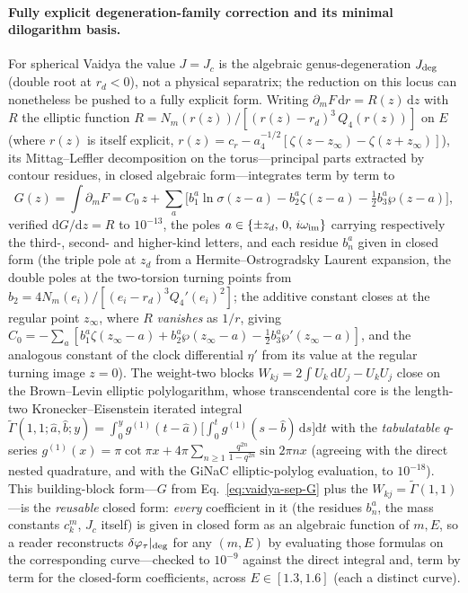 \documentclass[12pt]{iopart}
\newcommand{\Jc}{J_{c}}
\newcommand{\dd}{\mathrm{d}}
\begin{document}
\paragraph{Fully explicit degeneration-family correction and its minimal dilogarithm
basis.} For spherical Vaidya the value $J=\Jc$ is the algebraic genus-degeneration
$J_{\rm deg}$ (double root at $r_d<0$), not a physical separatrix; the reduction on this
locus can nonetheless be pushed to a fully explicit form. Writing
$\partial_m F\,\dd r=R(z)\,\dd z$ with $R$ the elliptic function
$R=N_m(r(z))/[(r(z)-r_d)^3\,Q_4(r(z))]$ on $E$ (where $r(z)$ is itself explicit,
$r(z)=c_r-a_4^{-1/2}[\zeta(z-z_\infty)-\zeta(z+z_\infty)]$), its Mittag--Leffler
decomposition on the torus---principal parts extracted by contour residues, in
closed algebraic form---integrates term by term to
\begin{equation}
    G(z)=\int\partial_m F=C_0\,z+\sum_a\Big[b_1^a\ln\sigma(z-a)-b_2^a\zeta(z-a)
        -\tfrac12 b_3^a\wp(z-a)\Big],
    \label{eq:vaidya-sep-G}
\end{equation}
verified $\dd G/\dd z=R$ to $10^{-13}$, the poles $a\in\{\pm z_d,\,0,\,i\omega_{\rm im}\}$
carrying respectively the third-, second- and higher-kind letters, and each residue
$b_n^a$ given in closed form (the triple pole at $z_d$ from a Hermite--Ostrogradsky
Laurent expansion, the double poles at the two-torsion turning points from
$b_2=4N_m(e_i)/[(e_i-r_d)^3 Q_4'(e_i)^2]$; the additive constant closes at the
regular point $z_\infty$, where $R$ \emph{vanishes} as $1/r$, giving
$C_0=-\sum_a[b_1^a\zeta(z_\infty-a)+b_2^a\wp(z_\infty-a)-\tfrac12 b_3^a
\wp'(z_\infty-a)]$, and the analogous constant of the clock differential
$\eta'$ from its value at the regular turning image $z=0$). The weight-two blocks
$W_{kj}=2\int U_k\,\dd U_j-U_kU_j$ close on the Brown--Levin elliptic
polylogarithm, whose transcendental core is the length-two Kronecker--Eisenstein
iterated integral~\cite{BrownLevin2011}
$\tilde\Gamma(1,1;\hat a,\hat b;y)=\int_0^y g^{(1)}(t-\hat a)\big[\int_0^t
g^{(1)}(s-\hat b)\,\dd s\big]\dd t$ with the \emph{tabulatable} $q$-series
$g^{(1)}(x)=\pi\cot\pi x+4\pi\sum_{n\ge1}\frac{q^{2n}}{1-q^{2n}}\sin 2\pi n x$
(agreeing with the direct nested quadrature, and with the GiNaC elliptic-polylog
evaluation, to $10^{-18}$). This building-block form---$G$ from
Eq.~\eqref{eq:vaidya-sep-G} plus the $W_{kj}=\tilde\Gamma(1,1)$---is the
\emph{reusable} closed form: \emph{every} coefficient in it (the residues $b_n^a$,
the mass constants $c_k^m$, $\Jc$ itself) is given in closed form as an algebraic
function of $m,E$, so a reader reconstructs $\delta\varphi_\tau|_{\rm deg}$ for any
$(m,E)$ by evaluating those formulas on the corresponding curve---checked to
$10^{-9}$ against the direct integral and, term by term for the closed-form
coefficients, across $E\in[1.3,1.6]$ (each a distinct curve).
\end{document}
